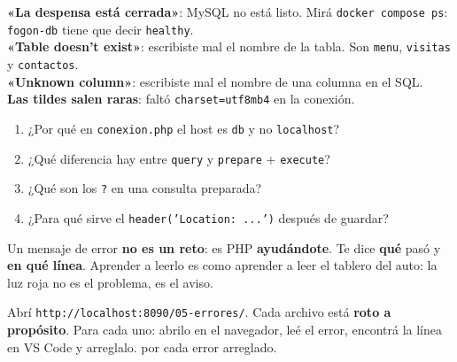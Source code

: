 \begin{errores}
\textbf{«La despensa está cerrada»}: MySQL no está listo. Mirá \texttt{docker compose ps}: \texttt{fogon-db} tiene que decir \texttt{healthy}.\\[1mm]
\textbf{«Table doesn't exist»}: escribiste mal el nombre de la tabla. Son \texttt{menu}, \texttt{visitas} y \texttt{contactos}.\\[1mm]
\textbf{«Unknown column»}: escribiste mal el nombre de una columna en el SQL.\\[1mm]
\textbf{Las tildes salen raras}: faltó \texttt{charset=utf8mb4} en la conexión.
\end{errores}

\begin{comprueba}
\begin{enumerate}
  \item ¿Por qué en \texttt{conexion.php} el host es \texttt{db} y no \texttt{localhost}?
  \item ¿Qué diferencia hay entre \texttt{query} y \texttt{prepare} + \texttt{execute}?
  \item ¿Qué son los \texttt{?} en una consulta preparada?
  \item ¿Para qué sirve el \texttt{header('Location: ...')} después de guardar?
\end{enumerate}
\end{comprueba}


\begin{analogia}
Un mensaje de error \textbf{no es un reto}: es PHP \textbf{ayudándote}. Te dice \textbf{qué} pasó y \textbf{en qué línea}. Aprender a
leerlo es como aprender a leer el tablero del auto: la luz roja no es el problema, es el aviso.
\end{analogia}

Abrí \texttt{http://localhost:8090/05-errores/}. Cada archivo está \textbf{roto a propósito}. Para cada uno: abrilo en el navegador,
leé el error, encontrá la línea en VS Code y arreglalo.  por cada error arreglado.


